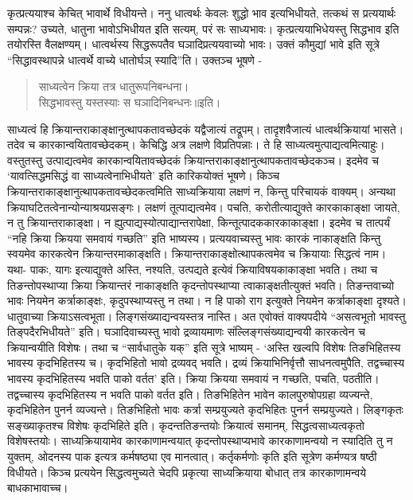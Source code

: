 कृत्प्रत्ययाश्च केचित् भावार्थे विधीयन्ते। ननु धात्वर्थः केवलः शुद्धो भाव इत्यभिधीयते, तत्कथं स प्रत्ययार्थः सम्पन्नः? उच्यते, धातुना भावोऽभिधीयत इति सत्यम्, परं सः साध्यभावः। कृत्प्रत्ययाभिधेयस्तु सिद्धभाव इति तयोरस्ति वैलक्षण्यम्। धात्वर्थस्य सिद्धरूपतैव घञादिप्रत्ययवाच्यो भावः। उक्तं कौमुद्यां भावे इति सूत्रे “सिद्धावस्थापन्ने धात्वर्थे वाच्ये धातोर्घञ् स्यादि”ति। उक्तञ्च भूषणे -
\begin{verse}
साध्यत्वेन क्रिया तत्र धातुरूपनिबन्धना।\\
सिद्धभावस्तु यस्तस्याः स घञादिनिबन्धनः॥इति।
\end{verse}
साध्यत्वं हि क्रियान्तराकाङ्क्षानुत्थापकतावच्छेदकं यद्वैजात्यं तद्रूपम्।     तादृशवैजात्यं धात्वर्थक्रियायां भासते। तदेव च कारकान्वयितावच्छेदकम्। केचिद्धि अत्र लक्षणे विप्रतिपन्नाः। ते हि साध्यत्वमुत्पाद्यत्वमित्याहुः। वस्तुतस्तु उत्पाद्यत्वमेव कारकान्वयितावच्छेदकं क्रियान्तराकाङ्क्षानुत्थापकतावच्छेदकञ्च। इदमेव च ‘यावत्सिद्धमसिद्धं वा साध्यत्वेनाभिधीयते’ इति कारिकयोक्तं भूषणे। किञ्च क्रियान्तराकाङ्क्षानुत्थापकतावच्छेदकत्वमिति साध्यक्रियाया लक्षणं न, किन्तु परिचायकं वाक्यम्। अन्यथा क्रियाघटितत्वेनान्योन्याश्रयप्रसङ्गः। लक्षणं तूत्पाद्यत्वमेव। पचति, करोतीत्याद्युक्ते कारकाकाङ्क्षा जायते, न तु क्रियान्तराकाङ्क्षा। न ह्युत्पाद्यस्योत्पाद्यान्तरापेक्षा, किन्तूत्पादककारकाकाङ्क्षा। इदमेव च तात्पर्यं “नहि क्रिया क्रियया समवायं गच्छति” इति भाष्यस्य। प्रत्ययवाच्यस्तु भावः कारकं नाकाङ्क्षति किन्तु स्वयमेव कारकत्वेन क्रियान्तरमाकाङ्क्षति। क्रियान्तराकाङ्क्षोत्थापकत्वमेव च क्रियायाः सिद्धत्वं नाम। यथा- पाकः, यागः इत्याद्युक्ते अस्ति, नश्यति, उत्पद्यते इत्येवं क्रियाविषयकाकाङ्क्षा भवति। तथा च तिङन्तोपस्थाप्या क्रिया क्रियान्तरं नाकाङ्क्षति कृदन्तोपस्थाप्या त्वाकाङ्क्षतीत्युक्तं भवति। तिङन्तवाच्यो भावः नियमेन कर्त्राकाङ्क्षः, कृदुपस्थाप्यस्तु न तथा। न हि पाको राग इत्युक्ते नियमेन कर्त्राकाङ्क्षा दृश्यते। धातुवाच्या क्रियाऽसत्वभूता। लिङ्गसंख्याद्यन्वयस्तत्र नास्ति। अत एवोक्तं वाक्यपदीये “असत्वभूतो भावस्तु तिङ्पदैरभिधीयते” इति। घञादिवाच्यस्तु भावो द्रव्यायमाणः संल्लिङ्गसंख्याद्यन्वयी कारकत्वेन च क्रियान्वयीति विशेषः। तथा च “सार्वधातुके यक्” इति सूत्रे भाष्यम् - ‘अस्ति खल्वपि विशेषः तिङभिहितस्य भावस्य कृदभिहितस्य च। कृदभिहितो भावो द्रव्यवद् भवति। द्रव्यं क्रियाभिनिर्वृत्तौ साधनत्वमुपैति, तद्वच्चास्य भावस्य कृदभिहितस्य भवति पाको वर्तत’ इति। क्रिया क्रियया समवायं न गच्छति, पचति, पठतीति। तद्वच्चास्य कृदभिहितस्य न भवति पाको वर्तत इति। तिङभिहितेन भावेन कालपुरुषोपग्रहा व्यज्यन्ते, कृदभिहितेन पुनर्न व्यज्यन्ते। तिङभिहितो भावः कर्त्रा सम्प्रयुज्यते कृदभिहितः पुनर्न सम्प्रयुज्यते। लिङ्गकृतः सङ्ख्याकृतश्च विशेषः कृदभिहिते इति। कृदन्ततिङन्तयोः क्रियात्वं समानम्, सिद्धत्वसाध्यत्वकृतो विशेषस्तयोः। साध्यक्रियायामेव कारकाणामन्वयात् कृदन्तोपस्थाप्यभावे कारकाणामन्वयो न स्यादिति तु न युक्तम्, ओदनस्य पाक इत्यत्र कर्मषष्ठ्या एव मानत्वात्। कर्तृकर्मणोः कृति इति सूत्रेण कर्मण्यत्र षष्ठी विधीयते। किञ्च प्रत्ययेन सिद्धत्वमुच्यते चेदपि प्रकृत्या साध्यक्रियाया बोधात् तत्र कारकाणामन्वये बाधकाभावाच्च।

